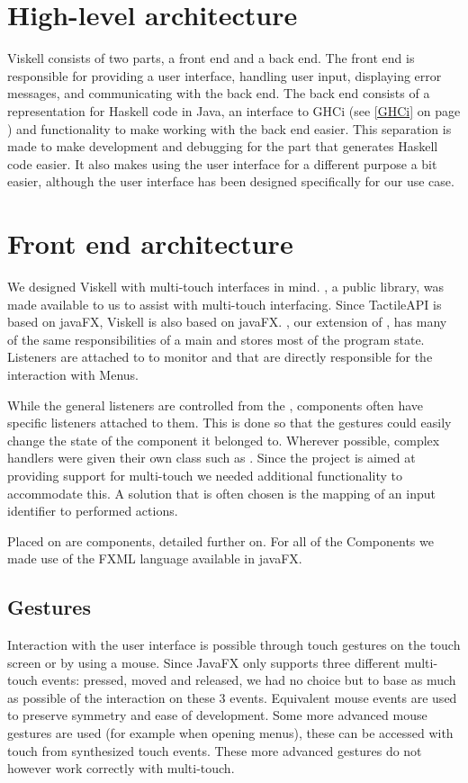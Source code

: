 \section{High-level architecture}
Viskell consists of two parts, a front end and a back end.  
The front end is responsible for providing a user interface, handling user input, displaying error messages, and communicating with the back end.
The back end consists of a representation for Haskell code in Java, an interface to GHCi (see \ref{GHCi} on page \pageref{GHCi}) and functionality to make working with the back end easier.
This separation is made to make development and debugging for the part that generates Haskell code easier.
It also makes using the user interface for a different purpose a bit easier, although the user interface has been designed specifically for our use case.

\section{Front end architecture}
We designed Viskell with multi-touch interfaces in mind. , a public library, was made available to us to assist with multi-touch interfacing. Since TactileAPI is based on javaFX, Viskell is also based on javaFX. , our extension of , has many of the same responsibilities of a main  and stores most of the program state.
Listeners are attached to  to monitor  and  that are directly responsible for the interaction with Menus.

While the general listeners are controlled from the , components often have specific listeners attached to them.
This is done so that the gestures could easily change the state of the component it belonged to. Wherever possible, complex handlers were given their own class such as . Since the project is aimed at providing support for multi-touch we needed additional functionality to accommodate this. A solution that is often chosen is the mapping of an input identifier to performed actions.

Placed on  are components, detailed further on. For all of the Components we made use of the FXML language available in javaFX.

\subsection{Gestures}
Interaction with the user interface is possible through touch gestures on the touch screen or by using a mouse. Since JavaFX only supports three different multi-touch events: pressed, moved and released, we had no choice but to base as much as possible of the interaction on these 3 events. Equivalent mouse events are used to preserve symmetry and ease of development. Some more advanced mouse gestures are used (for example when opening menus), these can be accessed with touch from synthesized touch events. These more advanced gestures do not however work correctly with multi-touch.

